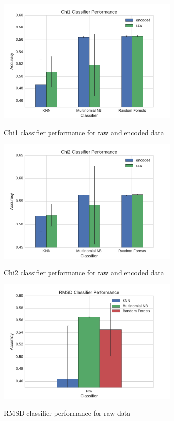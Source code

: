 \documentclass{article}
\begin{document}
\begin{figure}
  \caption{Chi1 classifier performance for raw and encoded data}
  \centering
  \includegraphics[width=0.8\textwidth]{chi1_cv.pdf}
  \label{fig:chi1_cv}
\end{figure}

\begin{figure}
  \caption{Chi2 classifier performance for raw and encoded data}
  \centering
  \includegraphics[width=0.8\textwidth]{chi2_cv.pdf}
  \label{fig:chi2_cv}
\end{figure}

\begin{figure}
  \caption{RMSD classifier performance for raw data}
  \centering
  \includegraphics[width=0.8\textwidth]{rmsd_raw_cv.pdf}
  \label{fig:rmsd_raw_cv}
\end{figure}
\end{document}
